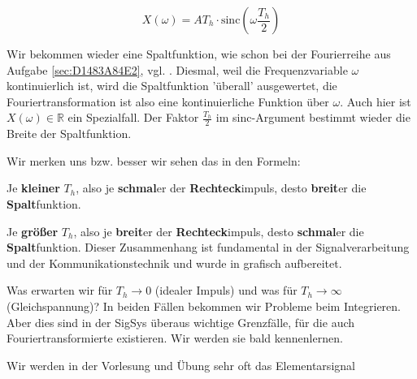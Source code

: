 \begin{Loesung}
\begin{equation}
\label{eq:8C3958BE4F_Loesung}
X(\omega) = A T_h \cdot \mathrm{sinc}(\omega \frac{T_h}{2})
\end{equation}

Wir bekommen wieder eine Spaltfunktion, wie schon bei der Fourierreihe aus Aufgabe
\ref{sec:D1483A84E2}, vgl. .
%
Diesmal, weil die Frequenzvariable $\omega$ kontinuierlich ist,
wird die Spaltfunktion 'überall' ausgewertet,
die Fouriertransformation ist also eine kontinuierliche Funktion über $\omega$.
%
Auch hier ist $X(\omega)\in\mathbb{R}$ ein Spezialfall.
%
Der Faktor $\frac{T_h}{2}$ im sinc-Argument bestimmt wieder die Breite der
Spaltfunktion.

Wir merken uns bzw. besser wir sehen das in den Formeln:

Je \textbf{kleiner} $T_h$, also je \textbf{schmal}er der
\textbf{Rechteck}impuls, desto \textbf{breit}er die \textbf{Spalt}funktion.

Je \textbf{größer} $T_h$, also je \textbf{breit}er der
\textbf{Rechteck}impuls, desto \textbf{schmal}er die \textbf{Spalt}funktion.
%
Dieser Zusammenhang ist fundamental in der Signalverarbeitung und der
Kommunikationstechnik und wurde in  grafisch aufbereitet.

Was erwarten wir für $T_h\to 0$ (idealer Impuls) und was für $T_h\to \infty$
(Gleichspannung)? In beiden Fällen bekommen
wir Probleme beim Integrieren. Aber dies sind in der SigSys überaus wichtige
Grenzfälle, für die auch Fouriertransformierte existieren. Wir werden sie bald
kennenlernen.

Wir werden in der Vorlesung und Übung sehr oft das Elementarsignal


\end{Loesung}
